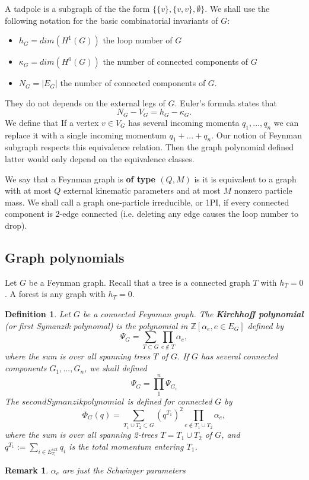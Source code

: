\documentclass[11pt]{article}
\newtheorem{dfn}[thm]{Definition}
\newtheorem{rmk}[thm]{Remark}
\newcommand{\intg}{\mathbb Z}
\begin{document}
A tadpole is a subgraph of the the form $\{\{v\},\{v,v\},\emptyset\}$. We shall use the following notation for the basic combinatorial invariants of $G$:
\begin{itemize}
\item $h_G=dim(H^1(G))$ the loop number of $G$
\item $\kappa_G=dim(H^0(G))$ the number of connected components of $G$
\item $N_G=|E_G|$ the number of connected components of $G$.
\end{itemize}
They do not depends on the external legs of $G$. Euler's formula states that
$$
N_G-V_G=h_G-\kappa_G.
$$
We define that If a vertex $v\in V_G$ has several incoming momenta $q_1,...,q_n$ we can replace it with a single incoming momentum $q_1 +...+ q_n$. Our notion of Feynman subgraph respects this equivalence relation. Then the graph polynomial defined latter would only depend on the equivalence classes.

We say that a Feynman graph is \textbf{of type $(Q,M)$} is it is equivalent to a graph with at most $Q$ external kinematic parameters and at most $M$ nonzero particle mass. We shall call a graph one-particle irreducible, or 1PI, if every connected component is 2-edge connected (i.e. deleting any edge causes the loop number to drop).
\subsection{Graph polynomials}
Let $G$ be a Feynman graph. Recall that a tree is a connected graph $T$ with $h_T=0$. A forest is any graph with $h_T=0$.
\begin{dfn}
Let $G$ be a connected Feynman graph. The \textbf{Kirchhoff polynomial} (or first Symanzik polynomal) is the polynomial in $\intg[\alpha_e,e\in E_G]$ defined by
$$
\Psi_G=\sum_{T\subset G}\prod_{e\not \in T}\alpha_e,
$$
where the sum is over all spanning trees $T$ of $G$. If $G$ has several connected components $G_1,...,G_n$, we shall defined
$$
\Psi_G=\prod_{1}^n\Psi_{G_i}
$$
The $second Symanzik polynomial$ is defined for connected $G$ by
$$
\Phi_G(q)=\sum_{T_1\cup T_2\subset G}(q^{T_1})^2 \prod_{e\not \in T_1\cup T_2}\alpha_e,
$$
where the sum  is over all spanning 2-trees $T=T_1\cup T_2$ of $G$, and $q^{T_1}:=\sum_{i\in E^{ext}_{T_1}}q_i$ is the total momentum entering $T_1$.
\end{dfn}

\begin{rmk}
$\alpha_e$ are just the Schwinger parameters
\end{rmk}
\end{document}
